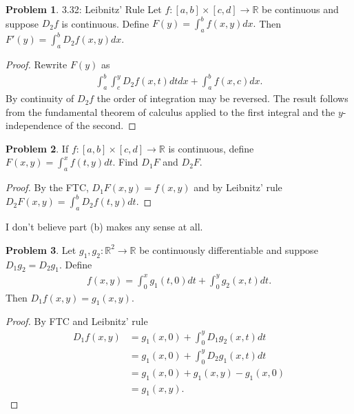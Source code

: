 \documentclass[20pt]{article}
\theoremstyle{plain}
\theoremstyle{definition}
\newtheorem*{problem}{Problem}
\newcommand{\reals}{\mathbb{R}}
\begin{document}
\begin{problem}{3.32: Leibnitz' Rule}
  Let $f: [a, b] \times [c, d] \to \reals$ be continuous and suppose
  $D_2f$ is continuous.  Define $F(y) = \int_a^bf(x, y)dx.$
  Then $F'(y) = \int_a^bD_2f(x, y)dx.$
\end{problem}

\begin{proof}
  Rewrite $F(y)$ as 
  \begin{align*}
    \int_a^b \int_c^y D_2f(x, t)dtdx + \int_a^b f(x, c) dx.
  \end{align*}
  By continuity of $D_2f$ the order of integration may be reversed.
  The result follows from the fundamental theorem of calculus applied to the
  first integral and the $y$-independence of the second.
\end{proof}


\begin{problem}{3.33}
  If $f:[a, b] \times [c, d] \to \reals$ is continuous, define
  $F(x, y) = \int_a^xf(t, y)dt.$ Find $D_1F$ and $D_2F$.
\end{problem}

\begin{proof}
  By the FTC, $D_1F(x, y) = f(x, y)$ and by Leibnitz' rule $D_2F(x, y) = \int_a^bD_2f(t, y)dt.$
\end{proof}
\color{Blue}
I don't believe part (b) makes any sense at all.
\color{Black}




\begin{problem}{3.34}
  Let $g_1, g_2: \reals^2 \to \reals$ be continuously differentiable and 
  suppose $D_1g_2 = D_2g_1.$  Define 
  \begin{align*}
    f(x, y) = \int_0^x g_1(t, 0)dt + \int_0^yg_2(x, t)dt.
  \end{align*}
  Then $D_1f(x, y) = g_1(x, y).$
\end{problem}

\begin{proof}
  By FTC and Leibnitz' rule
  \begin{align*}
    D_1f(x, y)
    &= g_1(x, 0) + \int_0^yD_1g_2(x, t)dt \\
    &= g_1(x, 0) + \int_0^yD_2g_1(x, t)dt \\
    &= g_1(x, 0) + g_1(x, y) - g_1(x, 0) \\
    &= g_1(x, y).
  \end{align*}
\end{proof}
\end{document}
